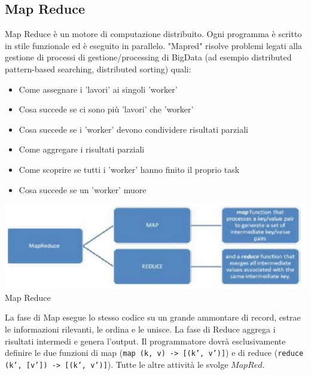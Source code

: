 \documentclass[a4page, 11pt]{article}
\begin{document}
\subsection{Map Reduce}
Map Reduce è un motore di computazione distribuito. Ogni programma è scritto in stile funzionale ed è eseguito in parallelo. "Mapred" risolve problemi legati alla gestione di processi di gestione/processing di BigData (ad esempio distributed pattern-based searching, distributed sorting) quali:
\begin{itemize}[noitemsep]
\item Come assegnare i 'lavori' ai singoli 'worker'
\item Cosa succede se ci sono più 'lavori' che 'worker'
\item Cosa succede se i 'worker' devono condividere risultati parziali
\item Come aggregare i risultati parziali
\item Come scoprire se tutti i 'worker' hanno finito il proprio task
\item Cosa succede se un 'worker' muore
\end{itemize}
\begin{center}
	\includegraphics[scale=1]{IMAGE8.png}\\
	Map Reduce
\end{center}
La fase di Map esegue lo stesso codice su un grande ammontare di record, estrae le informazioni rilevanti, le ordina e le unisce. La fase di Reduce aggrega i risultati intermedi e genera l’output. Il programmatore dovrà esclusivamente definire le due funzioni di map (\texttt{map (k, v) -> [(k’, v’)]}) e di reduce (\texttt{reduce (k’, [v’]) -> [(k’, v’)]}). Tutte le altre attività le svolge  $MapRed$.
\end{document}
